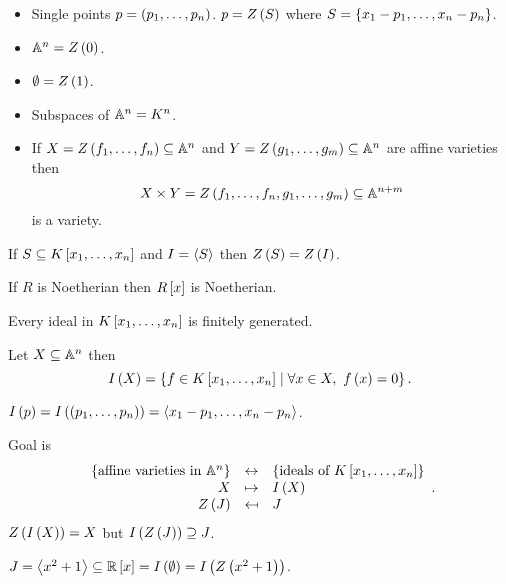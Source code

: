 \begin{example}
\hfill
\begin{itemize}
\item Single points $ p = \rb{p_1, \dots, p_n} $. $ p = Z\rb{S} $ where $ S = \cb{x_1 - p_1, \dots, x_n - p_n} $.
\item $ \A^n = Z\rb{0} $.
\item $ \emptyset = Z\rb{1} $.
\item Subspaces of $ \A^n = K^n $.
\item If $ X = Z\rb{f_1, \dots, f_n} \subseteq \A^n $ and $ Y = Z\rb{g_1, \dots, g_m} \subseteq \A^n $ are affine varieties then
$$ X \times Y = Z\rb{f_1, \dots, f_n, g_1, \dots, g_m} \subseteq \A^{n + m} $$
is a variety.
\end{itemize}
\end{example}

\begin{remark}
If $ S \subseteq K\sb{x_1, \dots, x_n} $ and $ I = \ab{S} $ then $ Z\rb{S} = Z\rb{I} $.
\end{remark}

\begin{theorem}
If $ R $ is Noetherian then $ R\sb{x} $ is Noetherian.
\end{theorem}

\begin{corollary}
Every ideal in $ K\sb{x_1, \dots, x_n} $ is finitely generated.
\end{corollary}

\begin{definition}
Let $ X \subseteq \A^n $ then
$$ I\rb{X} = \cb{f \in K\sb{x_1, \dots, x_n} \mid \forall x \in X, \ f\rb{x} = 0}. $$
\end{definition}

\begin{example}
$ I\rb{p} = I\rb{\rb{p_1, \dots, p_n}} = \ab{x_1 - p_1, \dots, x_n - p_n} $.
\end{example}

Goal is
$$
\begin{array}{rcl}
\cb{\text{affine varieties in} \ \A^n} & \leftrightarrow & \cb{\text{ideals of} \ K\sb{x_1, \dots, x_n}} \\
X & \mapsto & I\rb{X} \\
Z\rb{J} & \mapsfrom & J
\end{array}.
$$
$ Z\rb{I\rb{X}} = X $ but $ I\rb{Z\rb{J}} \supseteq J $.

\begin{example}
$ J = \ab{x^2 + 1} \subseteq \R\sb{x} = I\rb{\emptyset} = I\rb{Z\rb{x^2 + 1}} $.
\end{example}

